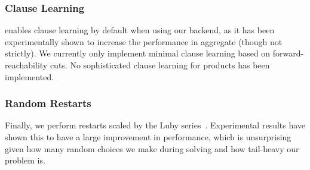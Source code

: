 \subsubsection{Clause Learning}\label{sec:clause-learning}

\Catra{} enables clause learning by default when using our backend, as it has
been experimentally shown to increase the performance in aggregate (though not
strictly). We currently only implement minimal clause learning based on
forward-reachability cuts. No sophisticated clause learning for products has
been implemented.

\subsubsection{Random Restarts}\label{sec:random-restarts}

Finally, we perform restarts scaled by the Luby series~\cite{luby}. Experimental
results have shown this to have a large improvement in performance, which is
unsurprising given how many random choices we make during solving and how
tail-heavy our problem is.

